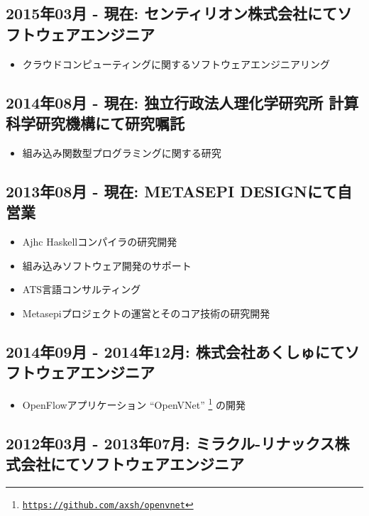 \documentclass[letterpaper]{article}
\begin{document}
\subsection*{2015年03月 - 現在: センティリオン株式会社にてソフトウェアエンジニア}

\begin{itemize}
  \item クラウドコンピューティングに関するソフトウェアエンジニアリング
\end{itemize}

\subsection*{2014年08月 - 現在: 独立行政法人理化学研究所 計算科学研究機構にて研究嘱託}

\begin{itemize}
  \item 組み込み関数型プログラミングに関する研究
\end{itemize}

\subsection*{2013年08月 - 現在: METASEPI DESIGNにて自営業}

\begin{itemize}
  \item Ajhc Haskellコンパイラの研究開発
  \item 組み込みソフトウェア開発のサポート
  \item ATS言語コンサルティング
  \item Metasepiプロジェクトの運営とそのコア技術の研究開発
\end{itemize}

\subsection*{2014年09月 - 2014年12月: 株式会社あくしゅにてソフトウェアエンジニア}

\begin{itemize}
  \item OpenFlowアプリケーション ``OpenVNet'' \footnote{\href{https://github.com/axsh/openvnet}{\tt https://github.com/axsh/openvnet}} の開発
\end{itemize}

\subsection*{2012年03月 - 2013年07月: ミラクル-リナックス株式会社にてソフトウェアエンジニア}
\end{document}
